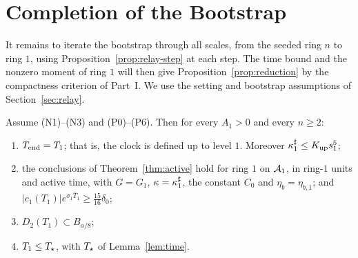 \section{Completion of the Bootstrap}
\label{sec:bootstrap}

It remains to iterate the bootstrap through all scales, from the seeded ring
$n$ to ring $1$, using Proposition~\ref{prop:relay-step} at each step.
The time bound and the nonzero moment of ring $1$ will then give
Proposition~\ref{prop:reduction} by the compactness criterion of Part~I.
We use the setting and bootstrap assumptions of Section~\ref{sec:relay}.

\begin{proposition}
\label{prop:bootstrap}
Assume \textup{(N1)}--\textup{(N3)} and \textup{(P0)}--\textup{(P6)}. Then for
every $A_1>0$ and every $n\ge2$:
\begin{enumerate}[label=\textup{(\arabic*)}]
\item $T_{\mathrm{end}}=T_1$; that is, the clock is defined up to level $1$. Moreover
  $\kappa^\sharp_1\le K_{\mathrm{up}} s_1^5$;
\item the conclusions of Theorem~\ref{thm:active} hold for ring $1$ on
  $\mathcal{A}_1$, in ring-$1$ units and active time, with $G=G_1$,
  $\kappa=\kappa^\sharp_1$, the constant $C_0$ and $\eta_b=\eta_{b,1}$; and
  $|c_1(T_1)|e^{\sigma_1\hat T_1}\ge\frac{15}{16}\delta_0$;
\item $D_2(T_1)\subset B_{a/8}$;
\item $T_1\le T_\star$, with $T_\star$ of Lemma~\ref{lem:time}.
\end{enumerate}
\end{proposition}

